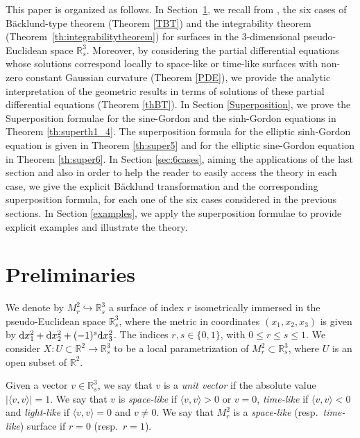\documentclass[pdftex]{sigma}
\numberwithin{equation}{section}
\begin{document}
 This paper is organized as follows. In Section~\ref{Prelim}, we recall from \cite{KRT2022}, the six cases of B\"acklund-type theorem (Theorem \ref{TBT}) and the integrability theorem
 (Theorem~\ref{th:integrabilitytheorem}) for surfaces in the 3-dimensional pseudo-Euclidean space ${\mathbb{R}}^3_s$. Moreover, by considering the partial differential equations whose solutions correspond locally to space-like or time-like surfaces with non-zero constant Gaussian curvature (Theorem \ref{PDE}), we provide the analytic interpretation of the geometric results in terms of solutions of these partial differential equations (Theorem \ref{thBT}).
 In Section \ref{Superposition}, we prove the Superposition formulae for the sine-Gordon and the sinh-Gordon equations in Theorem \ref{th:superth1_4}. The superposition formula for the elliptic sinh-Gordon equation is given in Theorem \ref{th:super5} and for the elliptic sine-Gordon equation in Theorem \ref{th:super6}. In Section \ref{sec:6cases},
aiming the applications of the last section and also in order to help the reader to easily access the theory in each case, we give the explicit
B\"acklund transformation and the corresponding superposition formula, for each one of the six cases considered in the previous sections.
 In Section \ref{examples}, we apply the superposition formulae to provide explicit examples and illustrate the theory.

\section{Preliminaries}\label{Prelim}
 We denote by $M_{r}^2\hookrightarrow {\mathbb{R}}_s^3$ a surface of index $r$ isome\-trically immersed in the pseudo-Euclidean space ${\mathbb{R}}^3_{s}$, where the metric in coordinates $(x_1,x_2,x_3)$ is given by ${\rm d}x_1^2+{\rm d}x_2^2+(-1)^s{\rm d}x_3^2$. The indices
$r, s\in \{ 0,1\}$, with $0\leq r\leq s\leq 1$. We consider $X\colon U\subset{\mathbb{R}}^2\rightarrow{\mathbb{R}}_{s}^3$ to be a local parametrization of $M_r^2\subset{\mathbb{R}}_s^3$, where $U$ is an open subset of ${\mathbb{R}}^2$.

 Given a vector $v\in{\mathbb{R}}^3_s$, we say that $v$ is a \textit{unit vector} if the absolute value $|\langle v,v\rangle|=1$.
 We say that $v$ is \textit{space-like} if $\langle v,v\rangle>0$ or $v=0$, \textit{time-like} if $\langle v,v\rangle<0$ and \textit{light-like} if $\langle v,v\rangle=0$ and $v\neq 0$. We say that $M_{r}^2$ is a \textit{space-like} (resp.\ \textit{time-like}) surface if $r=0$ (resp.\ $r=1$).
\end{document}
